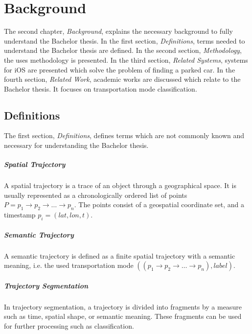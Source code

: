 \chapter{Background}
The second chapter, \textit{Background}, explains the necessary background to fully understand the Bachelor thesis. 
In the first section, \textit{Definitions}, terms needed to understand the Bachelor thesis are defined.
In the second section, \textit{Methodology}, the uses methodology is presented.
In the third section, \textit{Related Systems}, systems for iOS are presented which solve the problem of finding a parked car.
In the fourth section, \textit{Related Work}, academic works are discussed which relate to the Bachelor thesis. It focuses on transportation mode classification.

\section{Definitions}

The first section, \textit{Definitions}, defines terms which are not commonly known and necessary for understanding the Bachelor thesis. 

\paragraph{Spatial Trajectory} A spatial trajectory is a trace of an object through a geographical space. It is usually represented as a chronologically ordered list of points $ P = p_1\rightarrow p_2 \rightarrow \dots \rightarrow p_n$. The points consist of a geospatial coordinate set, and a timestamp $p_i=(lat,lon,t)$. \cite{Zheng:2015:TDM:2764959.2743025}

\paragraph{Semantic Trajectory} A semantic trajectory is defined as a finite spatial trajectory with a semantic meaning, i.e. the used transportation mode $((p_1\rightarrow p_2 \rightarrow \dots \rightarrow p_n), label)$. \cite{Zheng:2015:TDM:2764959.2743025}

\paragraph{Trajectory Segmentation} In trajectory segmentation, a trajectory is divided into fragments by a measure such as time, spatial shape, or semantic meaning. These fragments can be used for further processing such as classification. \cite{Zheng:2015:TDM:2764959.2743025}

